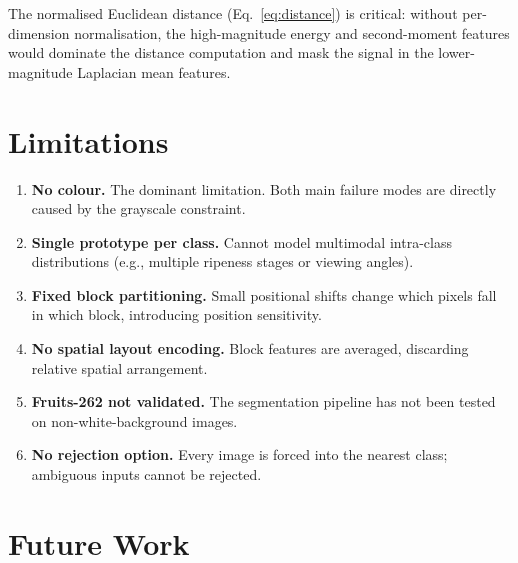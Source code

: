 \documentclass[11pt,a4paper]{article}
\begin{document}
The normalised Euclidean distance (Eq.~\ref{eq:distance}) is critical: without
per-dimension normalisation, the high-magnitude energy and second-moment
features would dominate the distance computation and mask the signal in the
lower-magnitude Laplacian mean features.

\section{Limitations}

\begin{enumerate}
  \item \textbf{No colour.}  The dominant limitation.  Both main failure modes
    are directly caused by the grayscale constraint.
  \item \textbf{Single prototype per class.}  Cannot model multimodal
    intra-class distributions (e.g., multiple ripeness stages or viewing
    angles).
  \item \textbf{Fixed block partitioning.}  Small positional shifts change
    which pixels fall in which block, introducing position sensitivity.
  \item \textbf{No spatial layout encoding.}  Block features are averaged,
    discarding relative spatial arrangement.
  \item \textbf{Fruits-262 not validated.}  The segmentation pipeline has
    not been tested on non-white-background images.
  \item \textbf{No rejection option.}  Every image is forced into the nearest
    class; ambiguous inputs cannot be rejected.
\end{enumerate}

\section{Future Work}
\end{document}
